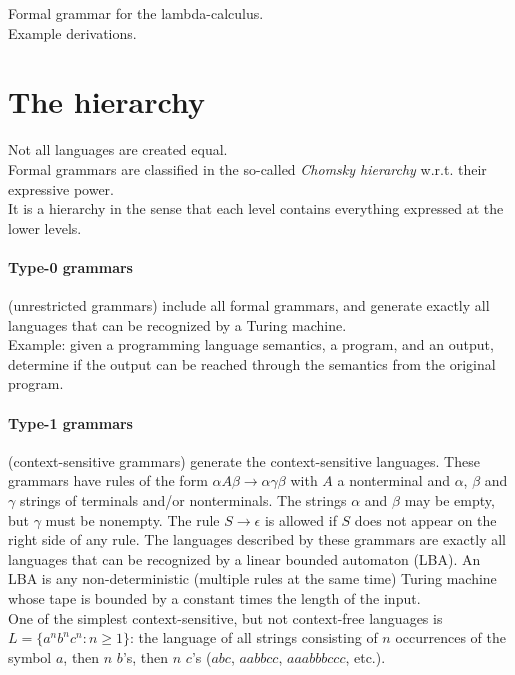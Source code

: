 \documentclass[12pt,b5paper]{book}
\theoremstyle{definition}
\begin{document}
Formal grammar for the lambda-calculus. \\

Example derivations. \\

\section{The hierarchy}
Not all languages are created equal. \\

Formal grammars are classified in the so-called \textit{Chomsky hierarchy} w.r.t. their expressive power. \\

It is a hierarchy in the sense that each level contains everything expressed at the lower levels. \\

\paragraph{Type-0 grammars} (unrestricted grammars) include all formal grammars, and generate exactly all languages that can be recognized by a Turing machine. \\ 

Example: given a programming language semantics, a program, and an output, determine if the output can be reached through the semantics from the original program.


\paragraph{Type-1 grammars} (context-sensitive grammars) generate the context-sensitive languages. These grammars have rules of the form $\alpha A \beta \rightarrow \alpha\gamma\beta$ with $A$ a nonterminal and $\alpha$, $\beta$ and $\gamma$ strings of terminals and/or nonterminals. The strings $\alpha$ and $\beta$ may be empty, but $\gamma$ must be nonempty. The rule $S \rightarrow \epsilon$ is allowed if $S$ does not appear on the right side of any rule. The languages described by these grammars are exactly all languages that can be recognized by a linear bounded automaton (LBA). An LBA is any non-deterministic (multiple rules at the same time) Turing machine whose tape is bounded by a constant times the length of the input. \\

One of the simplest context-sensitive, but not context-free languages is $L = \{ a^nb^nc^n : n \ge 1 \}$: the language of all strings consisting of $n$ occurrences of the symbol $a$, then $n$ $b$'s, then $n$ $c$'s ($abc$, $aabbcc$, $aaabbbccc$, etc.).
\end{document}
